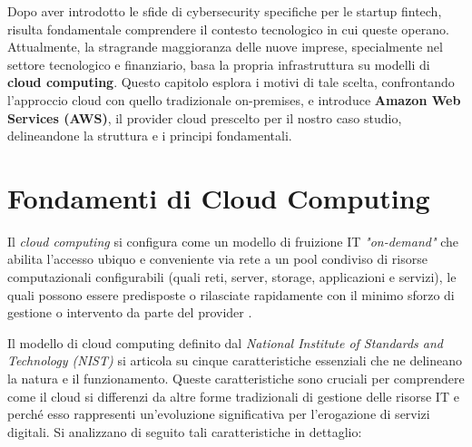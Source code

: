 Dopo aver introdotto le sfide di cybersecurity specifiche per le startup fintech, risulta fondamentale comprendere il contesto tecnologico in cui queste operano.
Attualmente, la stragrande maggioranza delle nuove imprese, specialmente nel settore tecnologico e finanziario, basa la propria infrastruttura su modelli di \textbf{cloud computing}.
Questo capitolo esplora i motivi di tale scelta, confrontando l'approccio cloud con quello tradizionale on-premises, e introduce \textbf{Amazon Web Services (AWS)}, il provider cloud prescelto per il nostro caso studio, delineandone la struttura e i principi fondamentali.

\section{Fondamenti di Cloud Computing}
Il \textit{cloud computing} si configura come un modello di fruizione IT \textit{"on-demand"} che abilita l'accesso ubiquo e conveniente via rete a un pool condiviso di risorse computazionali configurabili (quali reti, server, storage, applicazioni e servizi), le quali possono essere predisposte o rilasciate rapidamente con il minimo sforzo di gestione o intervento da parte del provider \cite{nist800-145}.

Il modello di cloud computing definito dal \textit{National Institute of Standards and Technology (NIST)} si articola su cinque caratteristiche essenziali che ne delineano la natura e il funzionamento.
Queste caratteristiche sono cruciali per comprendere come il cloud si differenzi da altre forme tradizionali di gestione delle risorse IT e perché esso rappresenti un'evoluzione significativa per l'erogazione di servizi digitali.
Si analizzano di seguito tali caratteristiche in dettaglio:

